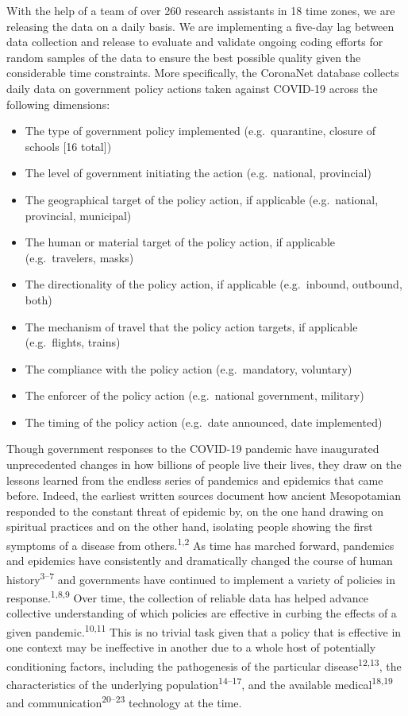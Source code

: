 \documentclass[]{article}
\providecommand{\tightlist}{%
  \setlength{\itemsep}{0pt}\setlength{\parskip}{0pt}}
\begin{document}
With the help of a team of over 260 research assistants in 18 time zones, we are releasing the data on a daily basis. We are implementing a five-day lag between data collection and release to evaluate and validate ongoing coding efforts for random samples of the data to ensure the best possible quality given the considerable time constraints. More specifically, the CoronaNet database collects daily data on government policy actions taken against COVID-19 across the following dimensions:

\begin{itemize}
\tightlist
\item
  The type of government policy implemented (e.g.~quarantine, closure of schools {[}16 total{]})
\item
  The level of government initiating the action (e.g.~national, provincial)
\item
  The geographical target of the policy action, if applicable (e.g.~national, provincial, municipal)
\item
  The human or material target of the policy action, if applicable (e.g.~travelers, masks)
\item
  The directionality of the policy action, if applicable (e.g.~inbound, outbound, both)
\item
  The mechanism of travel that the policy action targets, if applicable (e.g.~flights, trains)
\item
  The compliance with the policy action (e.g.~mandatory, voluntary)
\item
  The enforcer of the policy action (e.g.~national government, military)
\item
  The timing of the policy action (e.g.~date announced, date implemented)
\end{itemize}

Though government responses to the COVID-19 pandemic have inaugurated unprecedented changes in how billions of people live their lives, they draw on the lessons learned from the endless series of pandemics and epidemics that came before. Indeed, the earliest written sources document how ancient Mesopotamian responded to the constant threat of epidemic by, on the one hand drawing on spiritual practices and on the other hand, isolating people showing the first symptoms of a disease from others.\textsuperscript{1,2} As time has marched forward, pandemics and epidemics have consistently and dramatically changed the course of human history\textsuperscript{3--7} and governments have continued to implement a variety of policies in response.\textsuperscript{1,8,9} Over time, the collection of reliable data has helped advance collective understanding of which policies are effective in curbing the effects of a given pandemic.\textsuperscript{10,11} This is no trivial task given that a policy that is effective in one context may be ineffective in another due to a whole host of potentially conditioning factors, including the pathogenesis of the particular disease\textsuperscript{12,13}, the characteristics of the underlying population\textsuperscript{14--17}, and the available medical\textsuperscript{18,19} and communication\textsuperscript{20--23} technology at the time.
\end{document}
